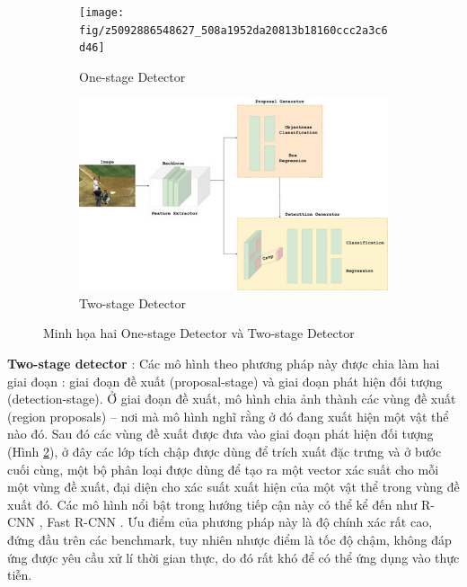 \documentclass[a4paper]{article}
\begin{document}
\begin{figure}[h]
	\centering
	\begin{subfigure}{0.45\textwidth}
		\centering
		\texttt{[image: fig/z5092886548627\_508a1952da20813b18160ccc2a3c6d46]}
		\caption{One-stage Detector}
		\label{fig:onestage}
	\end{subfigure}
	\begin{subfigure}{0.45\textwidth}
		\centering
		\includegraphics[width=\linewidth]{fig/z5092886306575_cdd8f127d1e80cf481c20b98939f77a9}
		\caption{Two-stage Detector}
		\label{fig:twostage}
	\end{subfigure}
	\captionsetup{justification=centering}
	\caption{Minh họa hai One-stage Detector và Two-stage Detector}
	\label{fig:combined}
\end{figure}

\textbf{Two-stage detector} :  Các mô hình theo phương pháp này được chia làm hai giai đoạn : giai đoạn đề xuất (proposal-stage) và giai đoạn phát hiện đối tượng (detection-stage). Ở giai đoạn đề xuất, mô hình chia ảnh thành các vùng đề xuất (region proposals) – nơi mà mô hình nghĩ rằng ở đó đang xuất hiện một vật thể nào đó. Sau đó các vùng đề xuất được đưa vào giai đoạn phát hiện đối tượng (Hình \ref{fig:twostage}), ở đây các lớp tích chập được dùng để trích xuất đặc trưng và ở bước cuối cùng, một bộ phân loại được dùng để tạo ra một vector xác suất cho mỗi một vùng đề xuất, đại diện cho xác suất xuất hiện của một vật thể trong vùng đề xuất đó. Các mô hình nổi bật trong hướng tiếp cận này có thể kể đến như R-CNN \cite{RCNN}, Fast R-CNN \cite{FRCNN}. Ưu điểm của phương pháp này là độ chính xác rất cao, đứng đầu trên các benchmark, tuy nhiên nhược điểm là tốc độ chậm, không đáp ứng được yêu cầu xử lí thời gian thực, do đó rất khó để có thể ứng dụng vào thực tiễn. \\
\end{document}
